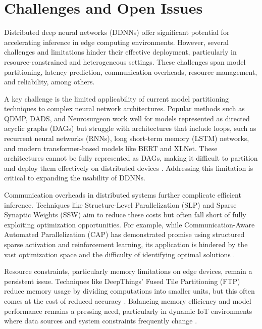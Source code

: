 \documentclass[conference]{IEEEtran}
\begin{document}
\section{Challenges and Open Issues}

Distributed deep neural networks (DDNNs) offer significant potential for accelerating inference in edge computing environments. However, several challenges and limitations hinder their effective deployment, particularly in resource-constrained and heterogeneous settings. These challenges span model partitioning, latency prediction, communication overheads, resource management, and reliability, among others.

A key challenge is the limited applicability of current model partitioning techniques to complex neural network architectures. Popular methods such as QDMP, DADS, and Neurosurgeon work well for models represented as directed acyclic graphs (DAGs) but struggle with architectures that include loops, such as recurrent neural networks (RNNs), long short-term memory (LSTM) networks, and modern transformer-based models like BERT and XLNet. These architectures cannot be fully represented as DAGs, making it difficult to partition and deploy them effectively on distributed devices \cite{zhang2021dynamic, zhao2018deepthings, zhou2021dynamic}. Addressing this limitation is critical to expanding the usability of DDNNs.

Communication overheads in distributed systems further complicate efficient inference. Techniques like Structure-Level Parallelization (SLP) and Sparse Synaptic Weights (SSW) aim to reduce these costs but often fall short of fully exploiting optimization opportunities. For example, while Communication-Aware Automated Parallelization (CAP) has demonstrated promise using structured sparse activation and reinforcement learning, its application is hindered by the vast optimization space and the difficulty of identifying optimal solutions \cite{zou2021cap}.

Resource constraints, particularly memory limitations on edge devices, remain a persistent issue. Techniques like DeepThings' Fused Tile Partitioning (FTP) reduce memory usage by dividing computations into smaller units, but this often comes at the cost of reduced accuracy \cite{zhao2018deepthings}. Balancing memory efficiency and model performance remains a pressing need, particularly in dynamic IoT environments where data sources and system constraints frequently change \cite{mohammed2020distributed, naveen2021low}.
\end{document}
